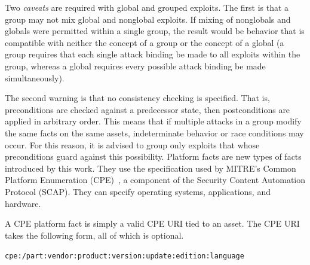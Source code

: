 Two \emph{caveats} are required with global and grouped exploits. The first
is that a group may not mix global and nonglobal exploits. If mixing of
nonglobals and globals were permitted within a single group, the result would
be behavior that is compatible with neither the concept of a group or the
concept of a global (a group requires that each single attack binding be made
to all exploits within the group, whereas a global requires every possible
attack binding be made simultaneously).

The second warning is that no consistency checking is specified. That is,
preconditions are checked against a predecessor state, then postconditions
are applied in arbitrary order. This means that if multiple attacks in a group
modify the same facts on the same assets, indeterminate behavior or race
conditions may occur. For this reason, it is advised to group only exploits that
whose preconditions guard against this possibility.
Platform facts are new types of facts introduced by this work. They use the
specification used by MITRE's Common Platform Enumeration 
(CPE)~\cite{buttner2009common}, a component
of the Security Content Automation Protocol (SCAP).
They can specify operating systems, applications, and hardware.

A CPE platform fact is simply a valid CPE URI tied to an asset. The CPE URI
takes the following form, all of which is optional.

\texttt{cpe:/part:vendor:product:version:update:edition:language}

